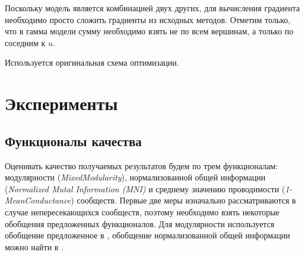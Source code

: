 \documentclass{ITaSconf}
\begin{document}
Поскольку модель является комбинацией двух других, для вычисления градиента необходимо просто сложить градиенты из исходных методов.
Отметим только, что в гамма модели сумму необходимо взять не по всем вершинам, а только по соседним к $u$.

Используется оригинальная схема оптимизации.

\section{Эксперименты}

\subsection{Функционалы качества}
Оценивать качество получаемых результатов будем по трем функционалам: модулярности (\textit{MixedModularity}), нормализованной общей информации (\textit{Normalized Mutal Information (MNI)} и среднему значению проводимости (\textit{1-MeanConductance}) сообществ.
Первые две меры изначально рассматриваются в случае непересекающихся сообществ, поэтому необходимо взять некоторые обобщения предложенных функционалов. Для модулярности используется обобщение предложенное в \cite{xie2013overlapping}, обобщение нормализованной общей информации можно найти в \cite{lancichinetti2009detecting}. 
\end{document}
